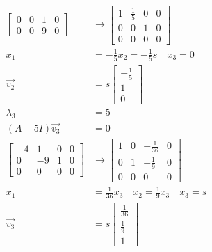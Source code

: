 \documentclass{math}
\begin{document}
\begin{enumerate}[(a)]
\begin{align*}
\begin{bmatrix}
      0 & 0 & 1 & 0 \\
      0 & 0 & 9 & 0
    \end{bmatrix} &\to \begin{bmatrix}
      1 & \frac{1}{5} & 0 & 0 \\
      0 & 0 & 1 & 0 \\
      0 & 0 & 0 & 0
    \end{bmatrix} \\
    x_1 &= -\frac{1}{5}x_2 = -\frac{1}{5}s \quad x_3 = 0 \\
    \vec{v_2} &= s\begin{bmatrix}-\frac{1}{5} \\ 1 \\ 0\end{bmatrix} \\
    \lambda_3 &= 5 \\
    (A-5I)\vec{v_3} &= 0 \\
    \begin{bmatrix}
      -4 & 1 & 0 & 0 \\
      0 & -9 & 1 & 0 \\
      0 & 0 & 0 & 0
    \end{bmatrix} &\to \begin{bmatrix}
      1 & 0 & -\frac{1}{36} & 0 \\
      0 & 1 & -\frac{1}{9} & 0 \\
      0 & 0 & 0 & 0
    \end{bmatrix} \\
    x_1 &= \frac{1}{36}x_3 \quad x_2 = \frac{1}{9}x_3 \quad x_3 = s \\
    \vec{v_3} &= s\begin{bmatrix}\frac{1}{36} \\ \frac{1}{9} \\ 1\end{bmatrix}
  \end{align*}
\end{enumerate}
\end{document}
